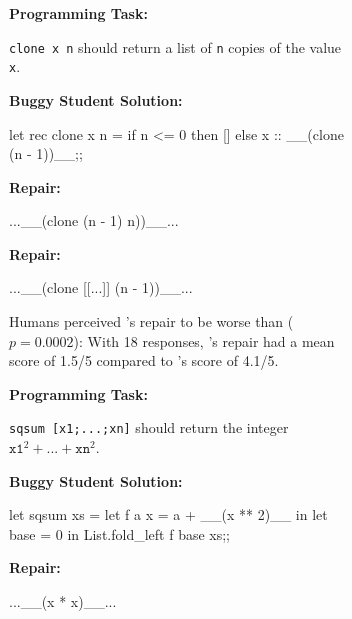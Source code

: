 \begin{figure}
\begin{subfigure}[t]{.1\textwidth}
\end{subfigure}\hfill
\begin{subfigure}[t]{.28\textwidth}
\begin{center}
\textbf{Programming Task:}
\end{center}
\texttt{clone x n} should return a list of
\texttt{n} copies of the value \texttt{x}.
\begin{center}
\textbf{Buggy Student Solution:}
\end{center}
\begin{compactcode}
let rec clone x n =
if n <= 0 then []
else x :: __(clone (n - 1))__;;
\end{compactcode}
\begin{center}
\textbf{\toolname Repair:}
\end{center}
\begin{compactcode}
 ...__(clone (n - 1) n))__...
\end{compactcode}
\begin{center}
\textbf{\seminal Repair:}
\end{center}
\begin{compactcode}
...__(clone [[...]] (n - 1))__...
\end{compactcode}
\caption{Humans perceived \toolname's repair to be
worse than \seminal ($p=0.0002$): With 18 responses, \toolname's
repair had a mean score of 1.5/5 compared to \seminal's
score of 4.1/5.}
\label{subfig:bad}
\end{subfigure}\hfill
\begin{subfigure}[t]{.1\textwidth}
\end{subfigure}\hfill
\begin{subfigure}[t]{.28\textwidth}
\begin{center}
\textbf{Programming Task:}
\end{center}
\texttt{sqsum [x1;...;xn]} should return the
integer $\texttt{x1}^2 + ... + \texttt{xn}^2$.
\begin{center}
\textbf{Buggy Student Solution:}
\end{center}
\begin{compactcode}
let sqsum xs =
let f a x = a + __(x ** 2)__ in
let base = 0 in
List.fold_left f base xs;;
\end{compactcode}
\begin{center}
\textbf{\toolname Repair:}
\end{center}
\begin{compactcode}
       ...__(x * x)__...
\end{compactcode}
\begin{center}

\end{center}
\end{subfigure}
\end{figure}
